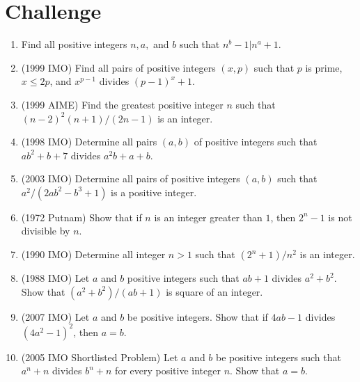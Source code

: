 \documentclass[12pt]{scrartcl}
\begin{document}
\section{Challenge}
\begin{enumerate}[resume]
    \item Find all positive integers $n, a,$ and $b$ such that $n^{b}-1 | n^a+1$.
    
    \item (1999 IMO) Find all pairs of positive integers $(x,p)$ such that $p$ is prime, $x \le 2p$, and $x^{p-1}$ divides $(p-1)^x+1$.
    
    \item (1999 AIME) Find the greatest positive integer $n$ such that $(n-2)^2(n+1)/(2n-1)$ is an integer.
    
    \item (1998 IMO) Determine all pairs $(a,b)$ of positive integers such that $ab^2+b+7$ divides $a^2b+a+b$.
    
    \item (2003 IMO) Determine all pairs of positive integers $(a,b)$ such that $a^2 / (2ab^2-b^3+1)$ is a positive integer.
    
    \item (1972 Putnam) Show that if $n$ is an integer greater than $1$, then $2^n-1$ is not divisible by $n$.
    
    \item (1990 IMO) Determine all integer $n>1$ such that $(2^n+1)/n^2$ is an integer.
    
    \item (1988 IMO) Let $a$ and $b$ positive integers such that $ab+1$ divides $a^2+b^2$. Show that $(a^2+b^2)/(ab+1)$ is square of an integer.
    
    \item (2007 IMO) Let $a$ and $b$ be positive integers. Show that if $4ab-1$ divides $(4a^2-1)^2$, then $a=b$.
    
    \item (2005 IMO Shortlisted Problem) Let $a$ and $b$ be positive integers such that $a^n+n$ divides $b^n+n$ for every positive integer $n$. Show that $a=b$.


    

\end{enumerate}
\end{document}
